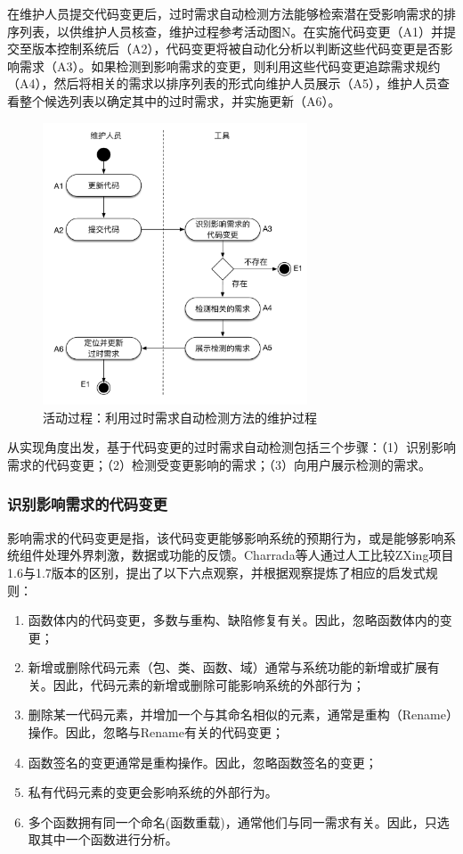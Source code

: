 在维护人员提交代码变更后，过时需求自动检测方法能够检索潜在受影响需求的排序列表，以供维护人员核查，维护过程参考活动图N\cite{ben2015supporting}。在实施代码变更（A1）并提交至版本控制系统后（A2），代码变更将被自动化分析以判断这些代码变更是否影响需求（A3）。如果检测到影响需求的变更，则利用这些代码变更追踪需求规约（A4），然后将相关的需求以排序列表的形式向维护人员展示（A5），维护人员查看整个候选列表以确定其中的过时需求，并实施更新（A6）。

\begin{figure}[thb]
    \centering
    \includegraphics[width=0.7\textwidth,height=0.4\textheight]{./figures/related_work/ActivityDiagram.pdf}
    \caption{活动过程：利用过时需求自动检测方法的维护过程}
    \label{F:ActivityDiagram}
\end{figure}

从实现角度出发，基于代码变更的过时需求自动检测包括三个步骤：（1）识别影响需求的代码变更；（2）检测受变更影响的需求；（3）向用户展示检测的需求。

\subsubsection{识别影响需求的代码变更}
影响需求的代码变更是指，该代码变更能够影响系统的预期行为，或是能够影响系统组件处理外界刺激，数据或功能的反馈\cite{glinz2007non}。Charrada等人通过人工比较ZXing项目1.6与1.7版本的区别，提出了以下六点观察，并根据观察提炼了相应的启发式规则：
\begin{enumerate}
  \item 函数体内的代码变更，多数与重构、缺陷修复有关。因此，忽略函数体内的变更；
  \item 新增或删除代码元素（包、类、函数、域）通常与系统功能的新增或扩展有关。因此，代码元素的新增或删除可能影响系统的外部行为；
  \item 删除某一代码元素，并增加一个与其命名相似的元素，通常是重构（Rename）操作。因此，忽略与Rename有关的代码变更；
  \item 函数签名的变更通常是重构操作。因此，忽略函数签名的变更；
  \item 私有代码元素的变更会影响系统的外部行为。
  \item 多个函数拥有同一个命名(函数重载)，通常他们与同一需求有关。因此，只选取其中一个函数进行分析。
\end{enumerate}

